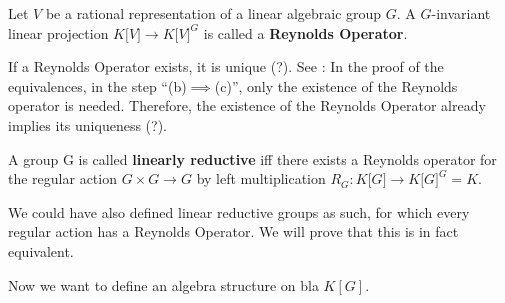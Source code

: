 \begin{definition}
  Let $ V $ be a rational representation of a linear algebraic group $ G $.
  A $ G $-invariant linear projection $ K\lbrack V\rbrack \longrightarrow K\lbrack V\rbrack^G $ is called a \textbf{Reynolds Operator}.
\end{definition}

\begin{remark}\label{unique}
  If a Reynolds Operator exists, it is unique (?).
  See \cite[p.39f]{DK15}: In the proof of the equivalences, in the step ``(b)$\implies$(c)'', only the existence of the Reynolds operator is needed.
  Therefore, the existence of the Reynolds Operator already implies its uniqueness (?).
\end{remark}

\begin{definition}
  A group G is called \textbf{linearly reductive} iff there exists a Reynolds operator for the regular action $ G \times G \longrightarrow G $ by left multiplication $ R_G \colon K\lbrack G \rbrack \longrightarrow K\lbrack G \rbrack^G = K $.
\end{definition}

\begin{remark}
  We could have also defined linear reductive groups as such, for which every regular action has a Reynolds Operator.
  We will prove that this is in fact equivalent.
\end{remark}

Now we want to define an algebra structure on bla $K[G]$.

